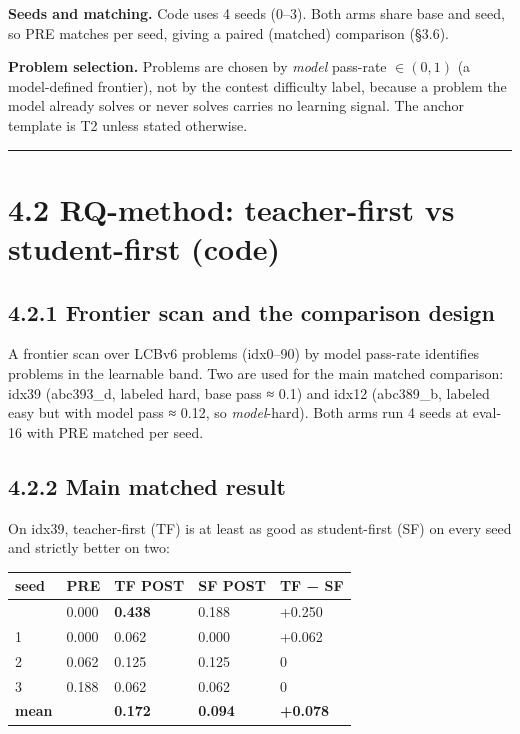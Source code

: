 \textbf{Seeds and matching.} Code uses 4 seeds (0--3). Both arms share base and seed, so PRE matches per seed, giving a paired (matched) comparison (§3.6).

\textbf{Problem selection.} Problems are chosen by \emph{model} pass-rate \(\in (0,1)\) (a model-defined frontier), not by the contest difficulty label, because a problem the model already solves or never solves carries no learning signal. The anchor template is T2 unless stated otherwise.

\begin{center}\rule{0.5\linewidth}{0.5pt}\end{center}

\section{4.2 RQ-method: teacher-first vs student-first (code)}\label{rq-method-teacher-first-vs-student-first-code}

\subsection{4.2.1 Frontier scan and the comparison design}\label{frontier-scan-and-the-comparison-design}

A frontier scan over LCBv6 problems (idx0--90) by model pass-rate identifies problems in the learnable band. Two are used for the main matched comparison: idx39 (abc393\_d, labeled hard, base pass ≈ 0.1) and idx12 (abc389\_b, labeled easy but with model pass ≈ 0.12, so \emph{model}-hard). Both arms run 4 seeds at eval-16 with PRE matched per seed.

\subsection{4.2.2 Main matched result}\label{main-matched-result}

On idx39, teacher-first (TF) is at least as good as student-first (SF) on every seed and strictly better on two:

\begin{longtable}[]{@{}lllll@{}}
\toprule\noalign{}
seed & PRE & TF POST & SF POST & TF − SF \\
\midrule\noalign{}
\endhead
\bottomrule\noalign{}
\endlastfoot
0 & 0.000 & \textbf{0.438} & 0.188 & +0.250 \\
1 & 0.000 & 0.062 & 0.000 & +0.062 \\
2 & 0.062 & 0.125 & 0.125 & 0 \\
3 & 0.188 & 0.062 & 0.062 & 0 \\
\textbf{mean} & & \textbf{0.172} & \textbf{0.094} & \textbf{+0.078} \\
\end{longtable}

